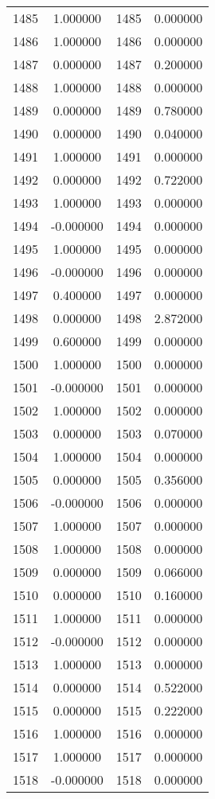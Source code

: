 \documentclass[12pt]{article}
\begin{document}
\begin{longtable}{@{}cccc@{}}
1485 & 1.000000 & 1485 & 0.000000 \\
1486 & 1.000000 & 1486 & 0.000000 \\
1487 & 0.000000 & 1487 & 0.200000 \\
1488 & 1.000000 & 1488 & 0.000000 \\
1489 & 0.000000 & 1489 & 0.780000 \\
1490 & 0.000000 & 1490 & 0.040000 \\
1491 & 1.000000 & 1491 & 0.000000 \\
1492 & 0.000000 & 1492 & 0.722000 \\
1493 & 1.000000 & 1493 & 0.000000 \\
1494 & -0.000000 & 1494 & 0.000000 \\
1495 & 1.000000 & 1495 & 0.000000 \\
1496 & -0.000000 & 1496 & 0.000000 \\
1497 & 0.400000 & 1497 & 0.000000 \\
1498 & 0.000000 & 1498 & 2.872000 \\
1499 & 0.600000 & 1499 & 0.000000 \\
1500 & 1.000000 & 1500 & 0.000000 \\
1501 & -0.000000 & 1501 & 0.000000 \\
1502 & 1.000000 & 1502 & 0.000000 \\
1503 & 0.000000 & 1503 & 0.070000 \\
1504 & 1.000000 & 1504 & 0.000000 \\
1505 & 0.000000 & 1505 & 0.356000 \\
1506 & -0.000000 & 1506 & 0.000000 \\
1507 & 1.000000 & 1507 & 0.000000 \\
1508 & 1.000000 & 1508 & 0.000000 \\
1509 & 0.000000 & 1509 & 0.066000 \\
1510 & 0.000000 & 1510 & 0.160000 \\
1511 & 1.000000 & 1511 & 0.000000 \\
1512 & -0.000000 & 1512 & 0.000000 \\
1513 & 1.000000 & 1513 & 0.000000 \\
1514 & 0.000000 & 1514 & 0.522000 \\
1515 & 0.000000 & 1515 & 0.222000 \\
1516 & 1.000000 & 1516 & 0.000000 \\
1517 & 1.000000 & 1517 & 0.000000 \\
1518 & -0.000000 & 1518 & 0.000000 \\

\end{longtable}
\end{document}
